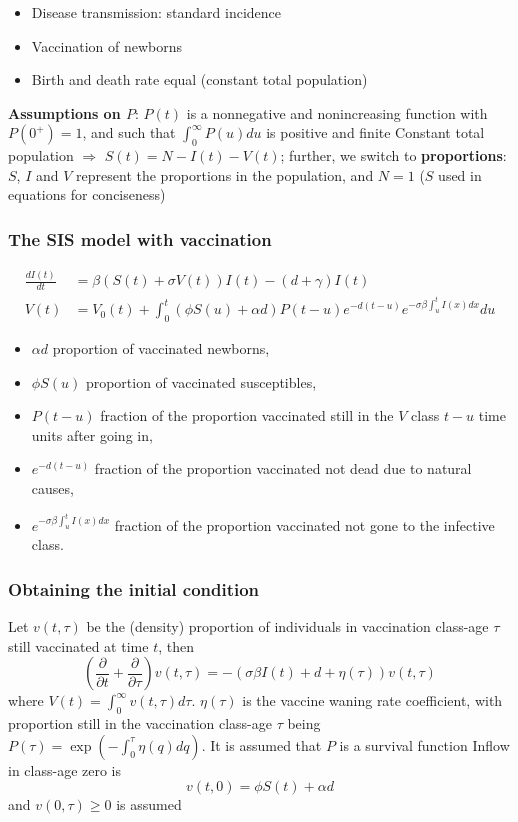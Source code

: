 \documentclass[aspectratio=169]{beamer}\usepackage[]{graphicx}\usepackage[]{xcolor}
\begin{document}
\begin{frame}\frametitle{}
\begin{itemize}
\item Disease transmission: standard incidence
\vfill
\item Vaccination of newborns
\vfill
\item Birth and death rate equal (\imply constant total population)
\end{itemize}

\textbf{Assumptions on $P$}: $P(t)$ is a nonnegative and nonincreasing
function with $P(0^+)=1$, and such that $\int_0^\infty P(u)du$ is
positive and finite
\vfill
Constant total population $\Rightarrow$ $S(t)=N-I(t)-V(t)$; further, we
switch to \textbf{proportions}: $S$, $I$ and $V$ represent the
proportions in the population, and $N=1$ ($S$ used in equations for
conciseness)
\end{frame}

\begin{frame}\frametitle{The SIS model with vaccination} 
\begin{subequations}\label{sys:SIVS_general}
\begin{align}
  \frac{dI(t)}{dt}&= \beta(S(t)+\sigma V(t))I(t)-(d+\gamma)I(t)
  \label{sys:SIVS_general_I}\\ 
  V(t)&= V_0(t) 
  +\int_0^t(\phi S(u)+\alpha d)P(t-u)e^{-d(t-u)}
  e^{-\sigma\beta\int_u^tI(x)dx}du \label{sys:SIVS_general_V}
\end{align}
\end{subequations}
\vfill
\begin{itemize}
\item $\alpha d$ proportion of vaccinated newborns,
\item $\phi S(u)$ proportion of vaccinated susceptibles, 
\item $P(t-u)$ fraction of the proportion vaccinated still in the $V$
  class $t-u$ time units after going in,
\item $e^{-d(t-u)}$ fraction of the proportion vaccinated
not dead due to natural causes,
\item $e^{-\sigma\beta\int_u^t I(x)dx}$ fraction of the proportion
  vaccinated not gone to the infective class.
\end{itemize} 
\end{frame}

\begin{frame}\frametitle{Obtaining the initial condition}
Let $v(t,\tau)$ be the (density) proportion of individuals in vaccination class-age $\tau$ still vaccinated at time $t$,
then
\begin{equation}\label{eq:SIVS_age_of_vaccination}
\left(\frac{\partial}{\partial t}+\frac{\partial}{\partial\tau}\right)
v(t,\tau)=
-(\sigma\beta I(t)+d+\eta(\tau))v(t,\tau)
\end{equation}
where $V(t)=\int_0^\infty v(t,\tau)d\tau$. $\eta(\tau)$ is the vaccine waning rate coefficient, with proportion still in the vaccination class-age $\tau$ being $P(\tau)=\exp\left(-\int_0^\tau\eta(q)dq\right)$.
It is assumed that $P$ is a survival function
\vfill
Inflow in class-age zero is 
\[
v(t,0)=\phi S(t)+\alpha d
\]
and $v(0,\tau)\geq 0$ is assumed
\end{frame}
\end{document}
